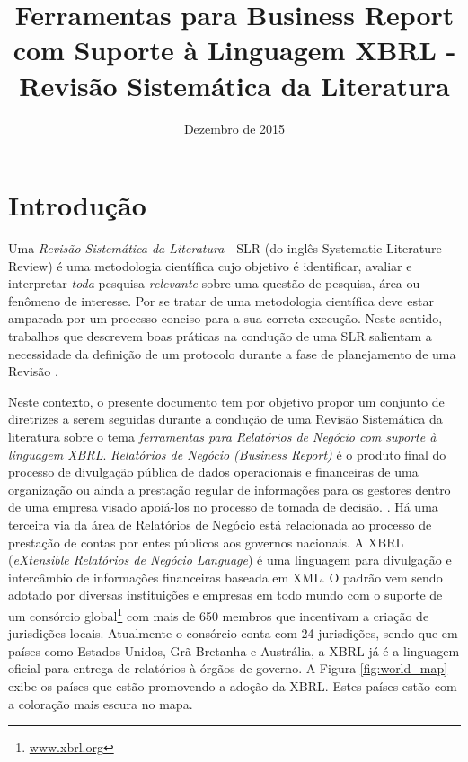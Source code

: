 \documentclass[12pt]{article}
\title{Ferramentas para Business Report \\
com Suporte à Linguagem XBRL - \\
Revisão Sistemática da Literatura}
\date{Dezembro de 2015}
\begin{document}
\maketitle


\begin{resumo}
\end{resumo}


\section{Introdução}
\label{sec:contexto}

Uma \textit{Revisão Sistemática da Literatura} - SLR (do inglês Systematic Literature Review) é uma
metodologia científica cujo objetivo é identificar, avaliar e interpretar
\textit{toda} pesquisa \textit{relevante} sobre uma questão de
pesquisa, área ou fenômeno de
interesse\cite{keele2007guidelines,wohlin2012experimentation}. Por se tratar de uma metodologia científica deve estar amparada por um processo conciso para a sua correta execução. Neste sentido, trabalhos que descrevem boas práticas na condução de uma SLR salientam a necessidade da definição de um protocolo durante a fase de planejamento de uma Revisão \cite{keele2007guidelines, biolchini2005systematic}.

Neste contexto, o presente documento tem por objetivo propor um conjunto de diretrizes a serem seguidas durante a condução de uma Revisão Sistemática da literatura sobre o tema \textit{ferramentas para Relatórios de Negócio com suporte à linguagem XBRL}. \textit{Relatórios  de Negócio (Business Report)} é o produto final do  processo de divulgação pública de dados operacionais e financeiras de uma organização ou ainda a prestação regular de informações para os gestores dentro de uma empresa visado apoiá-los no processo de tomada de decisão.
\cite{lymer1999business}. Há uma terceira via da área de  Relatórios de Negócio está relacionada ao processo de prestação de contas por entes públicos aos governos nacionais. A XBRL (\textit{eXtensible Relatórios de Negócio Language}) é uma linguagem para divulgação e intercâmbio de informações financeiras baseada em XML\cite{xbrl_conceitos_aplicacoes}. O padrão vem sendo adotado por diversas instituições e empresas em todo mundo com o suporte de um consórcio global\footnote{\url{www.xbrl.org}} com mais de 650 membros que incentivam a criação de jurisdições locais. Atualmente o consórcio conta com 24 jurisdições, sendo que em países como  Estados Unidos, Grã-Bretanha e Austrália, a XBRL já é a linguagem oficial para entrega
de relatórios à órgãos de governo. A Figura \ref{fig:world_map} exibe os países que estão promovendo a adoção da XBRL. Estes países estão com a coloração mais escura no mapa.
\end{document}
